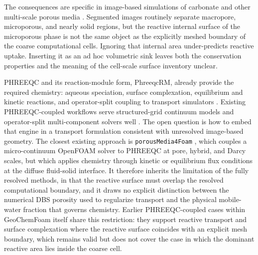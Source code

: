 The consequences are specific in image-based simulations of carbonate and other
multi-scale porous media \citep{menke2015dynamic, menke2018fourd,
menke2021upscaling,wildenschild2013xray,blunt2013porescale}. Segmented images
routinely separate macropore, microporous, and nearly solid regions, but the
reactive internal surface of the microporous phase is not the same object as
the explicitly meshed boundary of the coarse computational cells. Ignoring that
internal area under-predicts reactive uptake. Inserting it as an ad hoc
volumetric sink leaves both the conservation properties and the meaning of the
cell-scale surface inventory unclear.

PHREEQC and its reaction-module form, PhreeqcRM, already provide the required
chemistry: aqueous speciation, surface complexation, equilibrium and kinetic
reactions, and operator-split coupling to transport simulators
\citep{parkhurst2013phreeqc, parkhurst2015phreeqcrm,charlton2011modules}.
Existing PHREEQC-coupled workflows serve structured-grid continuum models and
operator-split multi-component solvers well \citep{jyoti2021validation}. The
open question is how to embed that engine in a transport formulation consistent
with unresolved image-based geometry. The closest existing approach is
\texttt{porousMedia4Foam} \citep{soulaine2021porousmedia4foam,
pavuluri2022reactive}, which couples a micro-continuum OpenFOAM solver to
PHREEQC at pore, hybrid, and Darcy scales, but which applies chemistry through
kinetic or equilibrium flux conditions at the diffuse fluid-solid interface. It
therefore inherits the limitation of the fully resolved methods, in that the
reactive surface must overlap the resolved computational boundary, and it draws
no explicit distinction between the numerical DBS porosity used to regularize
transport and the physical mobile-water fraction that governs chemistry.
Earlier PHREEQC-coupled cases within GeoChemFoam itself
\citep{maes2022heat,maes2022vos} share this restriction: they support reactive
transport and surface complexation where the reactive surface coincides with an
explicit mesh boundary, which remains valid but does not cover the case in
which the dominant reactive area lies inside the coarse cell.

